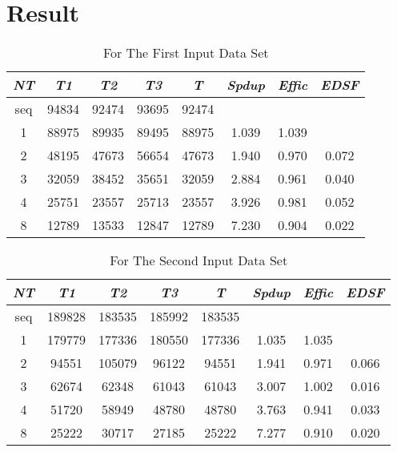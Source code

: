 \documentclass[12pt]{article}
\begin{document}
\section{Result}

\begin{table}[htb]
\begin{center}
\begin{normalsize}
\caption{For The First Input Data Set}
\begin {tabular} {|c|c|c|c|c|c|c|c|}
\hline 
\hline
{\em \bf NT} & {\em \bf T1} &{\em \bf T2}&{\em \bf T3}&{\em \bf T}&{\em \bf Spdup}&{\em \bf Effic}&{\em \bf EDSF}\\
\hline
seq&94834&92474&93695&92474&~&~&~\\
\hline
1&88975&89935&89495&88975&1.039&1.039&~\\
\hline
2&48195&47673&56654&47673&1.940&0.970&0.072\\
\hline
3&32059&38452&35651&32059&2.884&0.961&0.040\\
\hline
4&25751&23557&25713&23557&3.926&0.981&0.052\\
\hline
8&12789&13533&12847&12789&7.230&0.904&0.022\\
\hline
\end {tabular}
\end{normalsize}
\end{center}
\end {table}



\begin{table}[htb]
\begin{center}
\begin{normalsize}
\caption{For The Second Input Data Set}
\begin {tabular} {|c|c|c|c|c|c|c|c|}
\hline 
\hline
{\em \bf NT} & {\em \bf T1} &{\em \bf T2}&{\em \bf T3}&{\em \bf T}&{\em \bf Spdup}&{\em \bf Effic}&{\em \bf EDSF}\\
\hline
seq&189828&183535&185992&183535&~&~&~\\
\hline
1&179779&177336&180550&177336&1.035&1.035&~\\
\hline
2&94551&105079&96122&94551&1.941&0.971&0.066\\
\hline
3&62674&62348&61043&61043&3.007&1.002&0.016\\
\hline
4&51720&58949&48780&48780&3.763&0.941&0.033\\
\hline
8&25222&30717&27185&25222&7.277&0.910&0.020\\
\hline
\end {tabular}
\end{normalsize}
\end{center}
\end {table}
\end{document}
